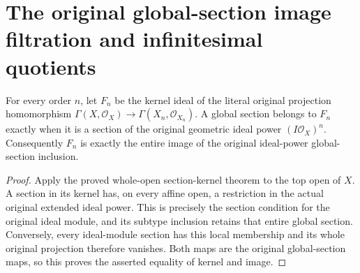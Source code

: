 \section{The original global-section image filtration and infinitesimal quotients}

\begin{lemma}
\label{lem:fibre-infinitesimal-global-image-kernel}
\leanok
For every order $n$, let $F_n$ be the kernel ideal of the literal original
projection homomorphism
$\Gamma(X,\mathcal O_X)\to\Gamma(X_n,\mathcal O_{X_n})$.
A global section belongs to $F_n$ exactly when it is a section of the
original geometric ideal power $(I\mathcal O_X)^n$. Consequently $F_n$
is exactly the entire image of the original ideal-power global-section
inclusion.
\end{lemma}
\begin{proof}
Apply the proved whole-open section-kernel theorem to the top open of
$X$. A section in its kernel has, on every affine open, a restriction
in the actual original extended ideal power. This is precisely the
section condition for the original ideal module, and its subtype
inclusion retains that entire global section. Conversely, every
ideal-module section has this local membership and its whole original
projection therefore vanishes. Both maps are the original global-section
maps, so this proves the asserted equality of kernel and image.
\end{proof}


